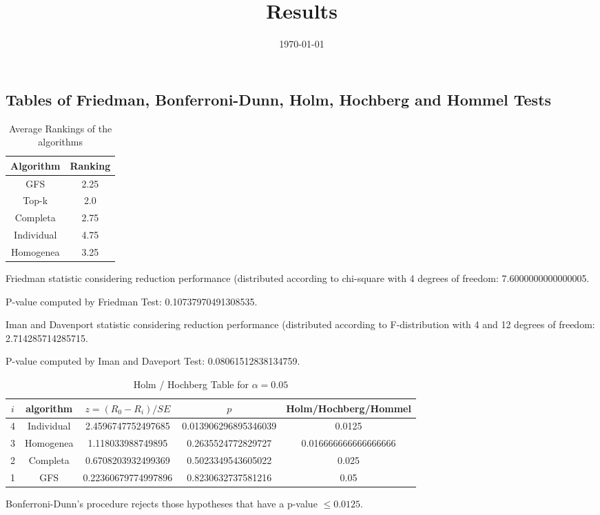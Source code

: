 \documentclass[a4paper,10pt]{article}
\title{Results}
\author{}
\date{\today}
\begin{document}
\begin{landscape}
\oddsidemargin 0in \topmargin 0in\maketitle
\section{Tables of Friedman, Bonferroni-Dunn, Holm, Hochberg and Hommel Tests}
\begin{table}[!htp]
\centering
\caption{Average Rankings of the algorithms
}\begin{tabular}{c|c}
Algorithm&Ranking\\
\hline
GFS&2.25\\
Top-k&2.0\\
Completa&2.75\\
Individual&4.75\\
Homogenea&3.25\\
\end{tabular}
\end{table}


Friedman statistic considering reduction performance (distributed according to chi-square with 4 degrees of freedom: 7.6000000000000005.


P-value computed by Friedman Test: 0.10737970491308535.\newline

Iman and Davenport statistic considering reduction performance (distributed according to F-distribution with 4 and 12 degrees of freedom: 2.714285714285715.


P-value computed by Iman and Daveport Test: 0.08061512838134759.\newline

\begin{table}[!htp]
\centering\tiny
\caption{Holm / Hochberg Table for $\alpha=0.05$}
\begin{tabular}{ccccc}
$i$&algorithm&$z=(R_0 - R_i)/SE$&$p$&Holm/Hochberg/Hommel\\
\hline
4&Individual&2.4596747752497685&0.013906296895346039&0.0125\\
3&Homogenea&1.118033988749895&0.2635524772829727&0.016666666666666666\\
2&Completa&0.6708203932499369&0.5023349543605022&0.025\\
1&GFS&0.22360679774997896&0.8230632737581216&0.05\\
\hline
\end{tabular}
\end{table}
Bonferroni-Dunn's procedure rejects those hypotheses that have a p-value $\le0.0125$.



\end{landscape}
\end{document}
